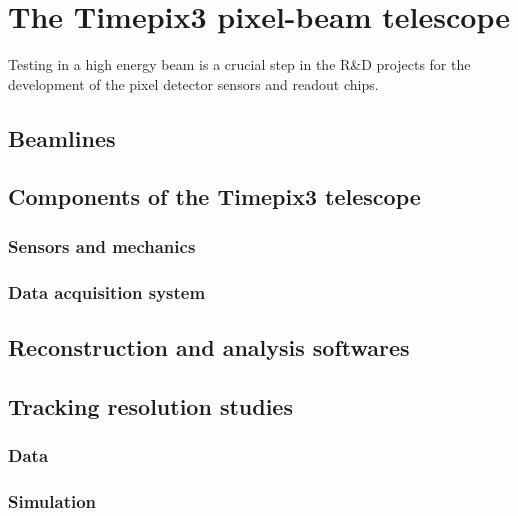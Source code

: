 \chapter{The Timepix3 pixel-beam telescope}
\label{ch:Telescope}

Testing in a high energy beam is a crucial step in the R\&D projects
for the development of the pixel detector sensors and readout chips. 
\section{Beamlines}
\section{Components of the Timepix3 telescope}
\subsection{Sensors and mechanics}
\subsection{Data acquisition system}
\section{Reconstruction and analysis softwares}
\section{Tracking resolution studies}
\subsection{Data}
\subsection{Simulation}


